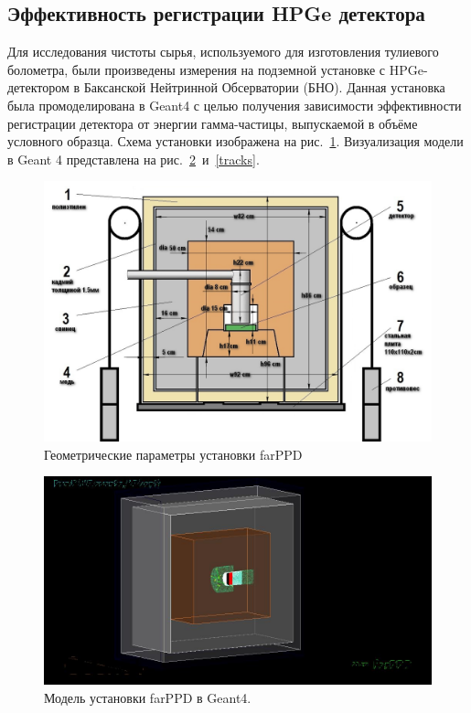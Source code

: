 \documentclass[a4paper,article,14pt]{extarticle}
\begin{document}
\subsection{Эффективность регистрации HPGe детектора}
Для исследования чистоты сырья, используемого для изготовления тулиевого болометра, были произведены измерения на подземной установке с HPGe-детектором в Баксанской Нейтринной Обсерватории (БНО).
Данная установка была промоделирована в Geant4 с целью получения зависимости эффективности регистрации детектора от энергии гамма-частицы, выпускаемой в объёме условного образца.
Схема установки изображена на рис.~\ref{fig:geom}.
Визуализация модели в Geant 4 представлена на рис.~\ref{vis}~и~\ref{tracks}.
\begin{figure}[t]
    \centering
    \includegraphics[width=.9\textwidth]{images/farPPD_size.jpg}
    \caption{Геометрические параметры установки farPPD}\label{fig:geom}
\end{figure}
\begin{figure}[t]
    \centering
    \includegraphics[width = .9\textwidth]{images/Visualisation.jpg}
    \caption{Модель установки farPPD в Geant4. }
    \label{vis}
\end{figure}
\end{document}
